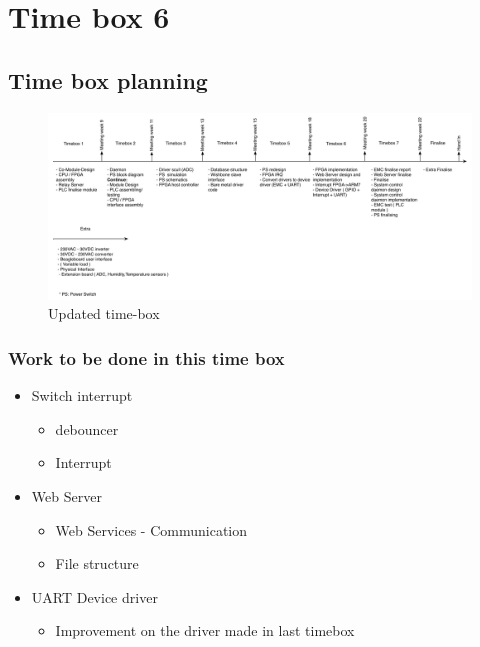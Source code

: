 \section{Time box 6}
\listoftodos
\subsection{Time box planning}

\begin{figure}[H]
	\begin{centering}
		\includegraphics[width=1.0\textwidth]{images/tb_r6.png}
		\caption{Updated time-box}
	\end{centering}
\end{figure}

\subsubsection{Work to be done in this time box}
\begin{itemize}
	\item Switch interrupt
	\begin{itemize}
		\item debouncer
		\item Interrupt
	\end{itemize}
	\item Web Server
		\begin{itemize}
			\item Web Services - Communication
			\item File structure
		\end{itemize}
	\item UART Device driver
	\begin{itemize}
		\item Improvement on the driver made in last timebox
	\end{itemize}
\end{itemize}

